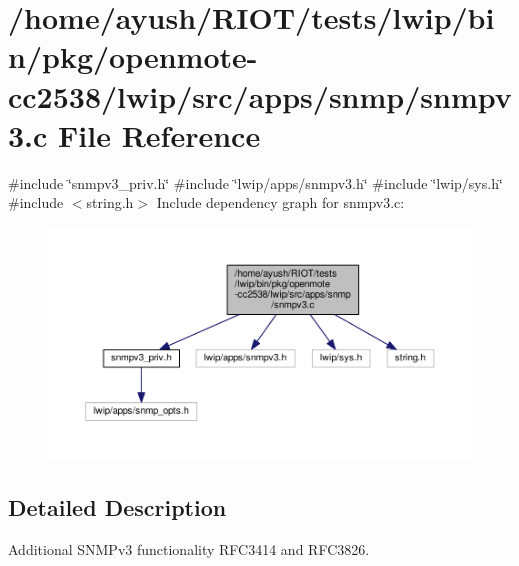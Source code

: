 \hypertarget{openmote-cc2538_2lwip_2src_2apps_2snmp_2snmpv3_8c}{}\section{/home/ayush/\+R\+I\+O\+T/tests/lwip/bin/pkg/openmote-\/cc2538/lwip/src/apps/snmp/snmpv3.c File Reference}
\label{openmote-cc2538_2lwip_2src_2apps_2snmp_2snmpv3_8c}
{\ttfamily \#include \char`\"{}snmpv3\+\_\+priv.\+h\char`\"{}}\newline
{\ttfamily \#include \char`\"{}lwip/apps/snmpv3.\+h\char`\"{}}\newline
{\ttfamily \#include \char`\"{}lwip/sys.\+h\char`\"{}}\newline
{\ttfamily \#include $<$string.\+h$>$}\newline
Include dependency graph for snmpv3.\+c\+:
\nopagebreak
\begin{figure}[H]
\begin{center}
\leavevmode
\includegraphics[width=350pt]{openmote-cc2538_2lwip_2src_2apps_2snmp_2snmpv3_8c__incl}
\end{center}
\end{figure}


\subsection{Detailed Description}
Additional S\+N\+M\+Pv3 functionality R\+F\+C3414 and R\+F\+C3826. 